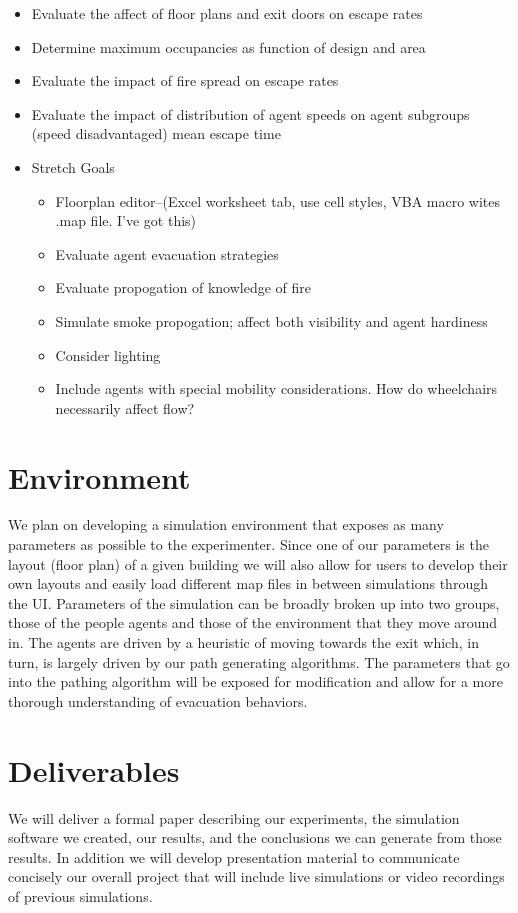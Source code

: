 \documentclass[12pt,letterpaper]{article}
\begin{document}
\begin{itemize}
\item Evaluate the affect of floor plans and exit doors on escape rates
\item Determine maximum occupancies as function of design and area
\item Evaluate the impact of fire spread on escape rates
\item Evaluate the impact of distribution of agent speeds on agent subgroups (speed disadvantaged) mean escape time
\item Stretch Goals
\begin{itemize}
\item Floorplan editor--(Excel worksheet tab, use cell styles, VBA macro wites .map file. I've got this)
\item Evaluate agent evacuation strategies
\item Evaluate propogation of knowledge of fire
\item Simulate smoke propogation; affect both visibility and agent hardiness
\item Consider lighting
\item Include agents with special mobility considerations. How do wheelchairs necessarily affect flow?
\end{itemize}
\end{itemize}

\section {Environment}

We plan on developing a simulation environment that exposes as many parameters as possible to the experimenter. Since one of our parameters is the layout (floor plan) of a given building we will also allow for users to develop their own layouts and easily load different map files in between simulations through the UI. Parameters of the simulation can be broadly broken up into two groups, those of the people agents and those of the environment that they move around in. The agents are driven by a heuristic of moving towards the exit which, in turn, is largely driven by our path generating algorithms\cite{caparriniGeneralSolverNetLogo2018, kneidl}.  The parameters that go into the pathing algorithm will be exposed for modification and allow for a more thorough understanding of evacuation behaviors. 



\section {Deliverables}
We will deliver a formal paper describing our experiments, the simulation software we created, our results, and the conclusions we can generate from those results. In addition we will develop presentation material to communicate concisely our overall project that will include live simulations or video recordings of previous simulations.




\end{document}
